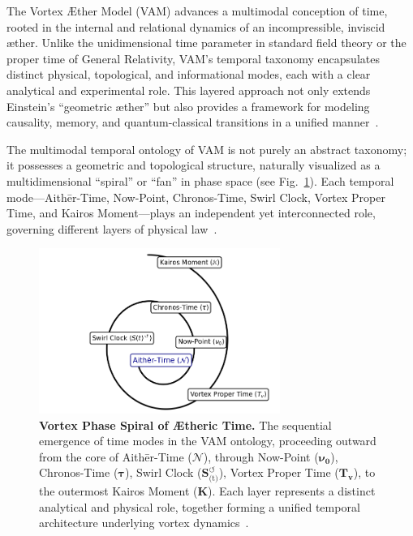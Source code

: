 The Vortex Æther Model (VAM) advances a multimodal conception of time, rooted in the internal and relational dynamics of an incompressible, inviscid æther. Unlike the unidimensional time parameter in standard field theory or the proper time of General Relativity, VAM’s temporal taxonomy encapsulates distinct physical, topological, and informational modes, each with a clear analytical and experimental role. This layered approach not only extends Einstein’s “geometric æther” but also provides a framework for modeling causality, memory, and quantum-classical transitions in a unified manner~\cite{VAM-8, VAM-13, VAM-15}.

The multimodal temporal ontology of VAM is not purely an abstract taxonomy; it possesses a geometric and topological structure, naturally visualized as a multidimensional “spiral” or “fan” in phase space (see Fig.~\ref{fig:temporal_ontology}). Each temporal mode—Aithēr-Time, Now-Point, Chronos-Time, Swirl Clock, Vortex Proper Time, and Kairos Moment—plays an independent yet interconnected role, governing different layers of physical law~\cite{VAM-8, VAM-13}.

\begin{figure}[htb]
    \centering
    \includegraphics[width=0.7\textwidth]{TemporalOntology}
    \caption{
        \textbf{Vortex Phase Spiral of Ætheric Time.}
        The sequential emergence of time modes in the VAM ontology, proceeding outward from the core of Aithēr-Time ($\boldsymbol{\mathcal{N}}$), through Now-Point ($\boldsymbol{\nu_0}$), Chronos-Time ($\boldsymbol{\tau}$), Swirl Clock ($\boldsymbol{S}^{\boldsymbol{\circlearrowleft}}_\text{(t)}$), Vortex Proper Time ($\boldsymbol{T_v}$), to the outermost Kairos Moment ($\mathbb{\boldsymbol{K}}$). Each layer represents a distinct analytical and physical role, together forming a unified temporal architecture underlying vortex dynamics~\cite{VAM-8, VAM-13}.
    }
    \label{fig:temporal_ontology}
\end{figure}

